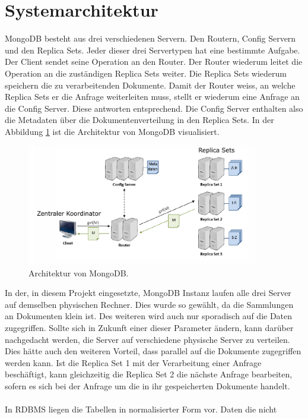  \section{Systemarchitektur}
 MongoDB besteht aus drei verschiedenen Servern. Den Routern, Config Servern und
 den Replica Sets. Jeder dieser drei Servertypen hat eine bestimmte Aufgabe.
 Der Client sendet seine Operation an den Router. Der Router wiederum leitet
 die Operation an die zuständigen Replica Sets weiter. Die Replica Sets wiederum 
 speichern die zu verarbeitenden Dokumente. Damit der Router weiss, an welche
 Replica Sets er die Anfrage weiterleiten muss, stellt er wiederum eine Anfrage
 an die Config Server. Diese antworten entsprechend. Die Config Server enthalten 
 also die Metadaten über die Dokumentenverteilung in den Replica Sets.
 In der Abbildung \ref{fig:archmong} ist die Architektur von MongoDB
 visualisiert.
\begin{figure}[htbp]
	\centering
    \includegraphics[width=0.9\textwidth]{./pictures/Architektur_MongoDB.png}
	\caption{Architektur von MongoDB. \cite{Kaufmann2016_DB}}
	\label{fig:archmong}
\end{figure}
 In der, in diesem Projekt eingesetzte, MongoDB Instanz laufen alle drei Server
 auf demselben physischen Rechner. Dies wurde so gewählt, da die Sammlungen an
 Dokumenten klein ist. Des weiteren wird auch nur sporadisch auf die Daten
 zugegriffen. Sollte sich in Zukunft einer dieser Parameter ändern, kann darüber
 nachgedacht werden, die Server auf verschiedene physische Server zu
 verteilen. Dies hätte auch den weiteren Vorteil, dass parallel auf die
 Dokumente zugegriffen werden kann. Ist die Replica Set 1 mit der Verarbeitung
 einer Anfrage beschäftigt, kann gleichzeitig die Replica Set 2 die nächste
 Anfrage bearbeiten, sofern es sich bei der Anfrage um die in ihr gespeicherten
 Dokumente handelt. \\\\
 In RDBMS liegen die Tabellen in normalisierter Form vor. Daten die nicht
